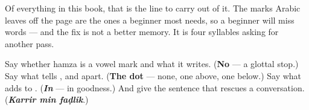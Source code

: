 Of everything in this book, that is the line to carry out of it. The marks Arabic leaves off the page are the ones a beginner most needs, so a beginner will miss words — and the fix is not a better memory. It is four syllables asking for another pass.

\begin{tcolorbox}[breakable,colback=teal!4,colframe=teal!35!black,title={Before you move on}]
Say whether hamza is a vowel mark and what it writes. (\textbf{No} — a glottal stop.) Say what tells \textbf{}, \textbf{} and \textbf{} apart. (\textbf{The dot} — none, one above, one below.) Say what \textbf{} adds to \textbf{}. (\emph{\textbf{In}} — in goodness.) And give the sentence that rescues a conversation. (\emph{\textbf{Karrir min faḍlik}}.)
\end{tcolorbox}
